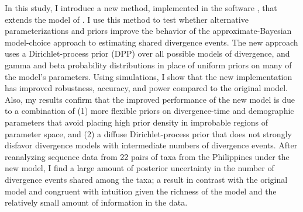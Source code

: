 

In this study, I introduce a new method, implemented in the software
\dppmsbayes, that extends the model of \msb.
I use this method to test whether alternative parameterizations and priors
improve the behavior of the approximate-Bayesian model-choice approach to
estimating shared divergence events.
The new approach uses a Dirichlet-process prior (DPP) over all possible models
of divergence, and gamma and beta probability distributions in place of uniform
priors on many of the model's parameters.
Using simulations, I show that the new implementation has improved robustness,
accuracy, and power compared to the original model.
Also, my results confirm that the improved performance of the new model
is due to a combination of
(1) more flexible priors on divergence-time and demographic parameters that
avoid placing high prior density in improbable regions of parameter space, and
(2) a diffuse Dirichlet-process prior that does not strongly disfavor
divergence models with intermediate numbers of divergence events.
After reanalyzing sequence data from 22 pairs of taxa from the Philippines
\cite{Oaks2012} under the new model, I find a large amount of posterior
uncertainty in the number of divergence events shared among the taxa; a result
in contrast with the original \msb model and congruent with
intuition given the richness of the model and the relatively small amount of
information in the data.


